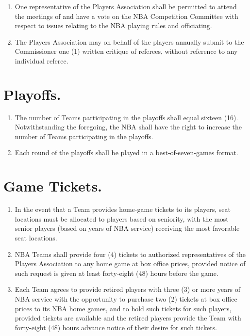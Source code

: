 \documentclass[
]{book}
\providecommand{\tightlist}{%
  \setlength{\itemsep}{0pt}\setlength{\parskip}{0pt}}
\begin{document}
\begin{enumerate}
\def\labelenumi{(\alph{enumi})}
\tightlist
\item
  One representative of the Players Association shall be permitted to attend the meetings of and have a vote on the NBA Competition Committee with respect to issues relating to the NBA playing rules and officiating.
\item
  The Players Association may on behalf of the players annually submit to the Commissioner one (1) written critique of referees, without reference to any individual referee.
\end{enumerate}

\hypertarget{playoffs.}{%
\section{Playoffs.}\label{playoffs.}}

\begin{enumerate}
\def\labelenumi{(\alph{enumi})}
\tightlist
\item
  The number of Teams participating in the playoffs shall equal sixteen (16). Notwithstanding the foregoing, the NBA shall have the right to increase the number of Teams participating in the playoffs.
\item
  Each round of the playoffs shall be played in a best-of-seven-games format.
\end{enumerate}

\hypertarget{game-tickets.}{%
\section{Game Tickets.}\label{game-tickets.}}

\begin{enumerate}
\def\labelenumi{(\alph{enumi})}
\tightlist
\item
  In the event that a Team provides home-game tickets to its players, seat locations must be allocated to players based on seniority, with the most senior players (based on years of NBA service) receiving the most favorable seat locations.
\item
  NBA Teams shall provide four (4) tickets to authorized representatives of the Players Association to any home game at box office prices, provided notice of such request is given at least forty-eight (48) hours before the game.
\item
  Each Team agrees to provide retired players with three (3) or more years of NBA service with the opportunity to purchase two (2) tickets at box office prices to its NBA home games, and to hold such tickets for such players, provided tickets are available and the retired players provide the Team with forty-eight (48) hours advance notice of their desire for such tickets.
\end{enumerate}
\end{document}
